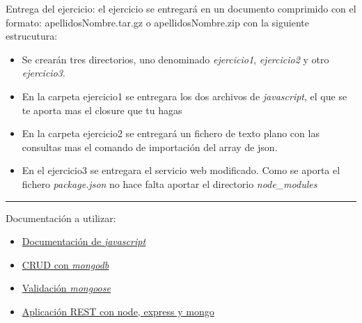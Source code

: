 \documentclass[addpoints,12pt]{exam}
\begin{document}
\newpage
Entrega del ejercicio: el ejercicio se entregará en un documento comprimido con el formato: apellidosNombre.tar.gz o apellidosNombre.zip con la siguiente estrucutura:
\begin{itemize}
\item Se crearán tres directorios, uno denominado \emph{ejercicio1}, \emph{ejercicio2} y otro \emph{ejercicio3}.
\item En la carpeta ejercicio1 se entregara los dos archivos de \emph{javascript}, el que se te aporta mas el closure que tu hagas
\item En la carpeta ejercicio2 se entregará un fichero de texto plano con las consultas mas el comando de importación del array de json.
\item En el ejercicio3 se entregara el servicio web modificado. Como se aporta el fichero \emph{package.json} no hace falta aportar el directorio \emph{node\_modules}
\end{itemize}
\vspace{0,5cm}
\hrule
\vspace{0,5cm}
Documentación a utilizar:
\begin{itemize}
\item \href{https://www.w3schools.com/js/}{Documentación de \emph{javascript}}
\item \href{https://docs.mongodb.com/manual/crud/}{CRUD con \emph{mongodb}}
\item \href{https://mongoosejs.com/docs/schematypes.html}{Validación \emph{mongoose}}
\item \href{https://www.codementor.io/olatundegaruba/nodejs-restful-apis-in-10-minutes-q0sgsfhbd}{Aplicación REST con node, express y mongo}
\end{itemize}
\end{document}

